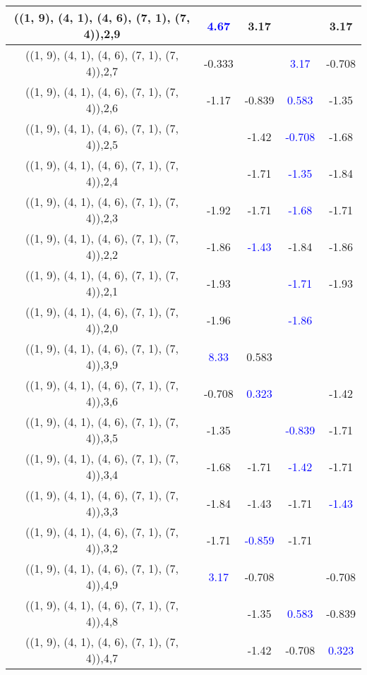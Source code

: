 \documentclass{article}
\begin{document}
\begin{center}
\begin{longtable}{|c|c|c|c|c|}
        	\hline
        	((1, 9), (4, 1), (4, 6), (7, 1), (7, 4)),2,9& \textcolor{blue}{4.67}&3.17&&3.17\\
        	\hline
        	((1, 9), (4, 1), (4, 6), (7, 1), (7, 4)),2,7&-0.333&& \textcolor{blue}{3.17}&-0.708\\
        	\hline
        	((1, 9), (4, 1), (4, 6), (7, 1), (7, 4)),2,6&-1.17&-0.839& \textcolor{blue}{0.583}&-1.35\\
        	\hline
        	((1, 9), (4, 1), (4, 6), (7, 1), (7, 4)),2,5&&-1.42& \textcolor{blue}{-0.708}&-1.68\\
        	\hline
        	((1, 9), (4, 1), (4, 6), (7, 1), (7, 4)),2,4&&-1.71& \textcolor{blue}{-1.35}&-1.84\\
        	\hline
        	((1, 9), (4, 1), (4, 6), (7, 1), (7, 4)),2,3&-1.92&-1.71& \textcolor{blue}{-1.68}&-1.71\\
        	\hline
        	((1, 9), (4, 1), (4, 6), (7, 1), (7, 4)),2,2&-1.86& \textcolor{blue}{-1.43}&-1.84&-1.86\\
        	\hline
        	((1, 9), (4, 1), (4, 6), (7, 1), (7, 4)),2,1&-1.93&& \textcolor{blue}{-1.71}&-1.93\\
        	\hline
        	((1, 9), (4, 1), (4, 6), (7, 1), (7, 4)),2,0&-1.96&& \textcolor{blue}{-1.86}&\\
        	\hline
        	((1, 9), (4, 1), (4, 6), (7, 1), (7, 4)),3,9& \textcolor{blue}{8.33}&0.583&&\\
        	\hline
        	((1, 9), (4, 1), (4, 6), (7, 1), (7, 4)),3,6&-0.708& \textcolor{blue}{0.323}&&-1.42\\
        	\hline
        	((1, 9), (4, 1), (4, 6), (7, 1), (7, 4)),3,5&-1.35&& \textcolor{blue}{-0.839}&-1.71\\
        	\hline
        	((1, 9), (4, 1), (4, 6), (7, 1), (7, 4)),3,4&-1.68&-1.71& \textcolor{blue}{-1.42}&-1.71\\
        	\hline
        	((1, 9), (4, 1), (4, 6), (7, 1), (7, 4)),3,3&-1.84&-1.43&-1.71& \textcolor{blue}{-1.43}\\
        	\hline
        	((1, 9), (4, 1), (4, 6), (7, 1), (7, 4)),3,2&-1.71& \textcolor{blue}{-0.859}&-1.71&\\
        	\hline
        	((1, 9), (4, 1), (4, 6), (7, 1), (7, 4)),4,9& \textcolor{blue}{3.17}&-0.708&&-0.708\\
        	\hline
        	((1, 9), (4, 1), (4, 6), (7, 1), (7, 4)),4,8&&-1.35& \textcolor{blue}{0.583}&-0.839\\
        	\hline
        	((1, 9), (4, 1), (4, 6), (7, 1), (7, 4)),4,7&&-1.42&-0.708& \textcolor{blue}{0.323}\\

\end{longtable}
\end{center}
\end{document}
